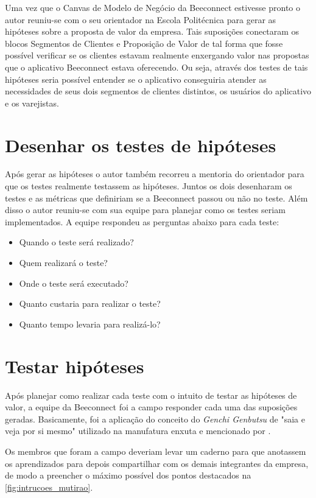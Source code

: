 Uma vez que o Canvas de Modelo de Negócio da Beeconnect estivesse pronto o autor reuniu-se com o seu orientador na Escola Politécnica para gerar as hipóteses sobre a proposta de valor da empresa. Tais suposições conectaram os blocos Segmentos de Clientes e Proposição de Valor de tal forma que fosse possível verificar se os clientes estavam realmente enxergando valor nas propostas que o aplicativo Beeconnect estava oferecendo. Ou seja, através dos testes de tais hipóteses seria possível entender se o aplicativo conseguiria atender as necessidades de seus dois segmentos de clientes distintos, os usuários do aplicativo e os varejistas.

\section{Desenhar os testes de hipóteses}
\label{cha:desenhar_hipoteses}
Após gerar as hipóteses o autor também recorreu a mentoria do orientador para que os testes realmente testassem as hipóteses. Juntos os dois desenharam os testes e as métricas que definiriam se a Beeconnect passou ou não no teste. 
Além disso o autor reuniu-se com sua equipe para planejar como os testes seriam implementados. A equipe respondeu as perguntas abaixo para cada teste:
\begin{itemize}
\item Quando o teste será realizado?
\item Quem realizará o teste?
\item Onde o teste será executado?
\item Quanto custaria para realizar o teste?
\item Quanto tempo levaria para realizá-lo?
\end{itemize}

\section{Testar hipóteses}
\label{cha:testar_hipoteses}
Após planejar como realizar cada teste com o intuito de testar as hipóteses de valor, a equipe da Beeconnect foi a campo responder cada uma das suposições geradas. Basicamente, foi a aplicação do conceito do \textit{Genchi Genbutsu} de "saia e veja por si mesmo" utilizado na manufatura enxuta e mencionado por .

Os membros que foram a campo deveriam levar um caderno para que anotassem os aprendizados para depois compartilhar com os demais integrantes da empresa, de modo a preencher o máximo possível dos pontos destacados na \autoref{fig:intrucoes_mutirao}. 

